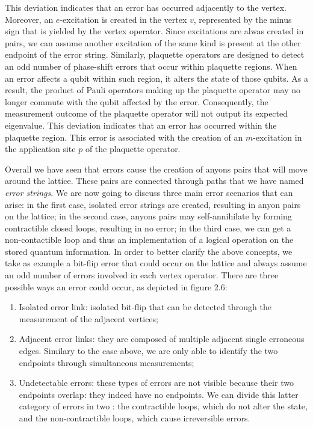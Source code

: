\documentclass{Configuration_Files/PoliMi3i_thesis}
\begin{document}
This deviation indicates that an error has occurred adjacently to the vertex. Moreover, an $e$-excitation is created in the vertex $v$, represented by the minus sign that is yielded by the vertex operator. Since excitations are alwas created in pairs, we can assume another excitation of the same kind is present at the other endpoint of the error string. \newline
Similarly, plaquette operators are designed to detect an odd number of phase-shift errors that occur within plaquette regions. When an error affects a qubit within such region, it alters the state of those qubits. As a result, the product of Pauli operators making up the plaquette operator may no longer commute with the qubit affected by the error. Consequently, the measurement outcome of the plaquette operator will not output its expected eigenvalue. This deviation indicates that an error has occurred within the plaquette region. This error is associated with the creation of an $m$-excitation in the application site $p$ of the plaquette operator. \newline

Overall we have seen that errors cause the creation of anyons pairs that will move around the lattice. These pairs are connected through paths that we have named {\it error strings}. We are now going to discuss three main error scenarios that can arise: in the first case, isolated error strings are created, resulting in anyon pairs on the lattice; in the second case, anyons pairs may self-annihilate by forming contractible closed loops, resulting in no error; in the third case, we can get a non-contactible loop and thus an implementation of a logical operation on the stored quantum information. \newline
In order to better clarify the above concepts, we take as example a bit-flip error that could occur on the lattice and always assume an odd number of errors involved in each vertex operator. There are three possible ways an error could occur, as depicted in figure 2.6: 

\begin{enumerate}
	\item Isolated error link: isolated bit-flip that can be detected through the measurement of the adjacent vertices;
	
	\item Adjacent error links: they are composed of multiple adjacent single erroneous edges. Similary to the case above, we are only able to identify the two endpoints through simultaneous measurements;
	
	\item Undetectable errors: these types of errors are not visible because their two endpoints overlap: they indeed have no endpoints. We can divide this latter category of errors in two : the contractible loops, which do not alter the state, and the non-contractible loops, which cause irreversible errors.
	
\end{enumerate}
\end{document}
